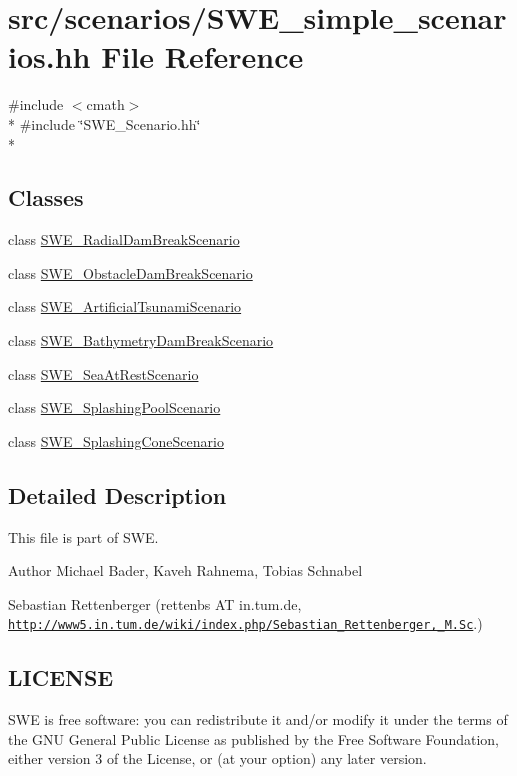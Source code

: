 \hypertarget{SWE__simple__scenarios_8hh}{\section{src/scenarios/\-S\-W\-E\-\_\-simple\-\_\-scenarios.hh File Reference}
\label{SWE__simple__scenarios_8hh}
}
{\ttfamily \#include $<$cmath$>$}\\*
{\ttfamily \#include \char`\"{}S\-W\-E\-\_\-\-Scenario.\-hh\char`\"{}}\\*
\subsection*{Classes}
\begin{DoxyCompactItemize}
\item 
class \hyperlink{classSWE__RadialDamBreakScenario}{S\-W\-E\-\_\-\-Radial\-Dam\-Break\-Scenario}
\item 
class \hyperlink{classSWE__ObstacleDamBreakScenario}{S\-W\-E\-\_\-\-Obstacle\-Dam\-Break\-Scenario}
\item 
class \hyperlink{classSWE__ArtificialTsunamiScenario}{S\-W\-E\-\_\-\-Artificial\-Tsunami\-Scenario}
\item 
class \hyperlink{classSWE__BathymetryDamBreakScenario}{S\-W\-E\-\_\-\-Bathymetry\-Dam\-Break\-Scenario}
\item 
class \hyperlink{classSWE__SeaAtRestScenario}{S\-W\-E\-\_\-\-Sea\-At\-Rest\-Scenario}
\item 
class \hyperlink{classSWE__SplashingPoolScenario}{S\-W\-E\-\_\-\-Splashing\-Pool\-Scenario}
\item 
class \hyperlink{classSWE__SplashingConeScenario}{S\-W\-E\-\_\-\-Splashing\-Cone\-Scenario}
\end{DoxyCompactItemize}


\subsection{Detailed Description}
This file is part of S\-W\-E.

\begin{DoxyAuthor}{Author}
Michael Bader, Kaveh Rahnema, Tobias Schnabel 

Sebastian Rettenberger (rettenbs A\-T in.\-tum.\-de, \href{http://www5.in.tum.de/wiki/index.php/Sebastian_Rettenberger,_M.Sc}{\tt http\-://www5.\-in.\-tum.\-de/wiki/index.\-php/\-Sebastian\-\_\-\-Rettenberger,\-\_\-\-M.\-Sc}.)
\end{DoxyAuthor}
\hypertarget{Writer_8hh_LICENSE}{}\subsection{L\-I\-C\-E\-N\-S\-E}\label{Writer_8hh_LICENSE}
S\-W\-E is free software\-: you can redistribute it and/or modify it under the terms of the G\-N\-U General Public License as published by the Free Software Foundation, either version 3 of the License, or (at your option) any later version.

